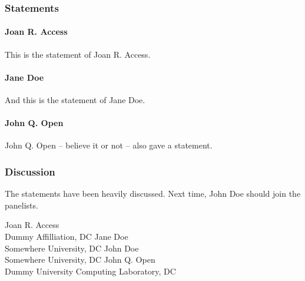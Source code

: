 \documentclass[a4paper,UKenglish]{dagrep}
\begin{document}
\subsubsection{Statements}

\paragraph{Joan R. Access}

This is the statement of Joan R. Access.

\paragraph{Jane Doe}

And this is the statement of Jane Doe.

\paragraph{John Q. Open}

John Q. Open -- believe it or not -- also gave a statement.

\subsubsection{Discussion}

The statements have been heavily discussed. Next time, John Doe should join the panelists.


\begin{participants}
\participant Joan R. Access\\ Dummy Affilliation, DC
\participant Jane Doe\\ Somewhere University, DC
\participant John Doe\\ Somewhere University, DC
\participant John Q. Open\\ Dummy University Computing Laboratory, DC
\end{participants}
\end{document}
